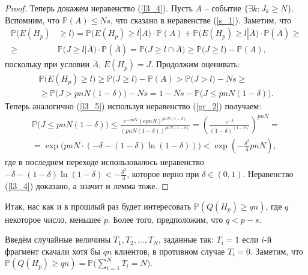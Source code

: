 \documentclass{matmex-diploma-custom}
\newcommand{\PRob}{\mathbb P}
\newcommand{\leqs}{\leqslant}
\newcommand{\geqs}{\geqslant}
\theoremstyle{named}
\begin{document}
\begin{proof}
Теперь докажем неравенство (\ref{l3_4}). Пусть $A$ -- событие $\{\exists k : J_k \geqs N\}$.
Вспомним, что $\PRob(A) \leqs Ns$, что сказано в неравенстве (\ref{s_1}). Заметим, что
\begin{equation}\begin{aligned}
\PRob\big( E(H_p) &\geqs l \big) = 
	\PRob\big(E(H_p) \geqs l | A\big) \cdot \PRob(A) + \PRob\big(E(H_p) \geqs l | \overline{A}\big) \cdot \PRob(\overline{A})
\geqs
\\
\geqs
&\PRob\big(J \geqs l | \overline{A}\big) \cdot \PRob(\overline{A})
	=
\PRob\big(J \geqs l \cap \overline{A} \big) 
	\geqs
\PRob\big(J \geqs l \big) - \PRob(A),
\end{aligned}\end{equation}
поскольку при условии $\overline{A}$, $E(H_p) = J$. Продолжим оценивать:
\begin{equation}\begin{aligned}
\PRob\big( E(H_p) \geqs l \big) 
	\geqs 
\PRob\big(J \geqs l \big) - \PRob(A) 
	>
\PRob\big(J > l \big) - Ns
	\geqs
\\
	\geqs
\PRob\big(J > pnN(1-\delta) \big) - Ns
	=
1 - Ns - \PRob\big( J \leqs pnN(1-\delta)  \big).
\end{aligned}\end{equation}
Теперь аналогично (\ref{l3_5}) используя неравенство (\ref{gr_2}) получаем:
\begin{equation}\begin{aligned}
\PRob\big( J \leqs pnN(1-\delta) \big) 
	\leqs
\frac{
	e^{-pnN}(epnN)^{pnN(1-\delta)}
}{
	(pnN(1-\delta))^{pnN(1-\delta)}
}
	=
\left( \frac{e^{-\delta}}{(1-\delta)^{(1-\delta)}} \right)^{pnN}
	=
\\
	=
\exp\big(pnN \cdot (-\delta - (1-\delta)\ln(1-\delta)) \big)
	<
\exp\left(-\frac{\delta^2}{4}pnN\right),
\end{aligned}\end{equation}
где в последнем переходе использовалось неравенство $-\delta - (1-\delta)\ln(1-\delta) < - \frac{\delta^2}{4}$, 
которое верно при $\delta \in (0,1)$. Неравенство (\ref{l3_4}) доказано, а значит и лемма тоже.
\end{proof}

Итак, нас как и в прошлый раз будет интересовать $\PRob(Q(H_p) \geqs qn)$, где $q$ некоторое число, меньшее $p$.
Более того, предположим, что $q < p - s$.

Введём случайные величины $T_1, T_2, \dots, T_N$, заданные так: $T_i = 1$ если $i$-й фрагмент скачали хотя бы $qn$ клиентов, 
в противном случае $T_i = 0$. Заметим, что $\PRob(Q(H_p) \geqs qn) = \PRob\big(\sum\limits_{i=1}^N T_i = N\big)$.
\end{document}
